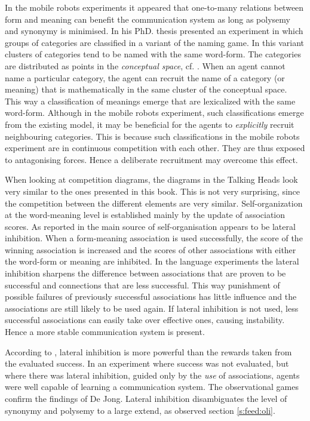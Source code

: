 In the mobile robots experiments it appeared that one-to-many relations between form and meaning can benefit the communication system as long as polysemy and synonymy is minimised. In his PhD. thesis \citet{kaplan:2000} presented an experiment in which groups of categories are classified in a variant of the naming game. In this variant clusters of categories tend to be named with the same word-form. The categories are distributed as points in the {\em conceptual space}, cf. \citep{gardenfors:1996}. When an agent cannot name a particular category, the agent can recruit the name of a category (or meaning) that is mathematically in the same cluster of the conceptual space. This way a classification of meanings emerge that are lexicalized with the same word-form. Although in the mobile robots experiment, such classifications emerge from the existing model, it may be beneficial for the agents to {\em explicitly} recruit neighbouring categories. This is because such classifications in the mobile robots experiment are in continuous competition with each other. They are thus exposed to antagonising forces. Hence a deliberate recruitment may overcome this effect.



When looking at competition diagrams, the diagrams in the Talking Heads look very similar to the ones presented in this book. This is not very surprising, since the competition between the different elements are very similar. Self-organization at the word-meaning level is established mainly by the update of association scores. As reported in \citep{steels:2000,dejong:2000,kaplan:2000} the main source of self-organisation appears to be lateral inhibition. When a form-meaning association is used successfully, the score of the winning association is increased and the scores of other associations with either the word-form or meaning are inhibited. In the language experiments the lateral inhibition sharpens the difference between associations that are proven to be successful and connections that are less successful. This way punishment of possible failures of previously successful associations has little influence and the associations are still likely to be used again. If lateral inhibition is not used, less successful associations can easily take over effective ones, causing instability. Hence a more stable communication system is present.

According to \citet{dejong:2000}, lateral inhibition is more powerful than the rewards taken from the evaluated success. In an experiment where success was not evaluated, but where there was lateral inhibition, guided only by the {\em use} of associations, agents were well capable of learning a communication system. The observational games confirm the findings of De Jong. Lateral inhibition disambiguates the level of synonymy and polysemy to a large extend, as observed section \ref{s:feed:oli}.

